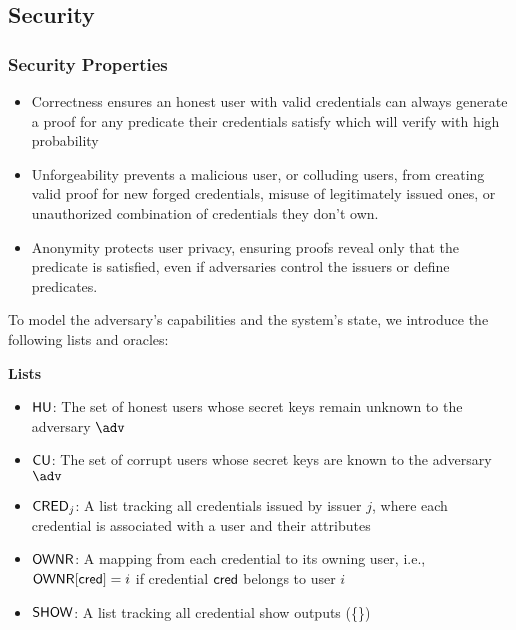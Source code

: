 \newpage
\subsection{Security}


\subsubsection{Security Properties}

\begin{itemize}
    \item Correctness ensures an honest user with valid credentials can always generate a proof for any predicate their credentials satisfy which will verify with high probability

    \item Unforgeability prevents a malicious user, or colluding users, from creating valid proof for new forged credentials, misuse of legitimately issued ones, or unauthorized combination of credentials they don't own.

    \item Anonymity protects user privacy, ensuring proofs reveal only that the predicate is satisfied, even if adversaries control the issuers or define predicates. 
\end{itemize}

To model the adversary’s capabilities and the system’s state, we introduce the following lists and oracles:


\noindent\textbf{Lists}
\begin{itemize}
    \item $\mathsf{HU}$: The set of honest users whose secret keys remain unknown to the adversary $\adv$
    \item $\mathsf{CU}$: The set of corrupt users whose secret keys are known to the adversary $\adv$
    \item $\mathsf{CRED}_j$: A list tracking all credentials issued by issuer $j$, where each credential is associated with a user and their attributes
    \item $\mathsf{OWNR}$: A mapping from each credential to its owning user, i.e., $\mathsf{OWNR}[\mathsf{cred}] = i$ if credential $\mathsf{cred}$ belongs to user $i$
    \item $\mathsf{SHOW}$: A list tracking all credential show outputs (\{\})
\end{itemize} 

